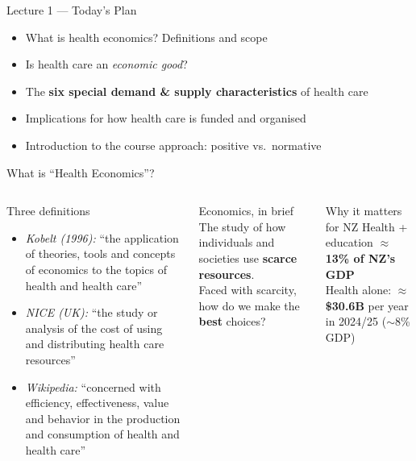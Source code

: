 \documentclass[aspectratio=169, 12pt]{beamer}
\begin{document}
\begin{frame}{Lecture 1 — Today's Plan}
  \begin{itemize}
    \item What is health economics? Definitions and scope
    \item Is health care an \emph{economic good}?
    \item The \textbf{six special demand \& supply characteristics} of health care
    \item Implications for how health care is funded and organised
    \item Introduction to the course approach: positive vs.\ normative
  \end{itemize}
\end{frame}

\begin{frame}{What is ``Health Economics''?}
  \begin{columns}
      \begin{block}{Three definitions}
        \begin{itemize}
          \item \textit{Kobelt (1996):} ``the application of theories, tools and concepts
                of economics to the topics of health and health care''
          \item \textit{NICE (UK):} ``the study or analysis of the cost of using and
                distributing health care resources''
          \item \textit{Wikipedia:} ``concerned with efficiency, effectiveness, value and
                behavior in the production and consumption of health and health care''
        \end{itemize}
      \end{block}
      \begin{alertblock}{Economics, in brief}
        The study of how individuals and societies use \textbf{scarce resources}.\\[0.4em]
        Faced with scarcity, how do we make the \textbf{best} choices?
      \end{alertblock}
      \vspace{0.4em}
      \begin{exampleblock}{Why it matters for NZ}
        Health + education $\approx$ \textbf{13\% of NZ's GDP}\\
        Health alone: $\approx$\textbf{\$30.6B} per year in 2024/25 ($\sim$8\% GDP)
      \end{exampleblock}
  \end{columns}
\end{frame}
\end{document}
